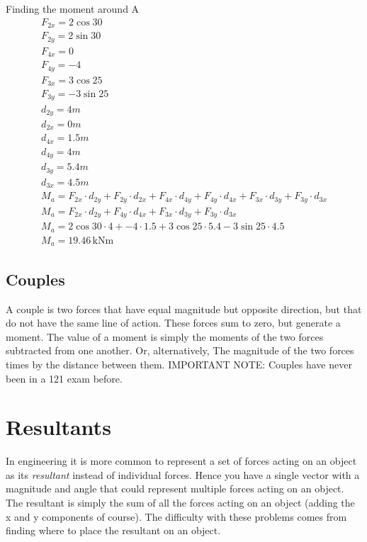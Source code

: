 \documentclass[a4paper, 12pt]{article}
\newcommand{\unit}[1]{\ensuremath{\, \mathrm{#1}}}
\begin{document}
Finding the moment around A
\begin{gather*}
    F_{2x} = 2\cos{30} \\ 
    F_{2y} = 2\sin{30} \\
    F_{4x} = 0 \\ 
    F_{4y} = -4 \\
    F_{3x} = 3\cos{25} \\
    F_{3y} = -3\sin{25} \\
    d_{2y} = 4m \\
    d_{2x} = 0m \\
    d_{4x} = 1.5m \\
    d_{4y} = 4m \\
    d_{3y} = 5.4m \\
    d_{3x} = 4.5m \\
    M_a = F_{2x} \cdot d_{2y} + F_{2y} \cdot d_{2x} + F_{4x} \cdot d_{4y} + F_{4y} \cdot d_{4x} + F_{3x} \cdot d_{3y} + F_{3y} \cdot d_{3x} \\
    M_a = F_{2x} \cdot d_{2y} + F_{4y} \cdot d_{4x} + F_{3x} \cdot d_{3y} + F_{3y} \cdot d_{3x} \\
    M_a = 2\cos{30} \cdot 4 + -4 \cdot 1.5 + 3\cos{25} \cdot 5.4 - 3\sin{25} \cdot 4.5 \\ 
    M_a = 19.46 \unit{kNm}
\end{gather*}
\subsection{Couples}
A couple is two forces that have equal magnitude but opposite direction, but that do not have the same line of action.
These forces sum to zero, but generate a moment. The value of a moment is simply the moments of the two forces subtracted from one another.
Or, alternatively, The magnitude of the two forces times by the distance between them. IMPORTANT NOTE: Couples have never been in a 121 exam before.

\section{Resultants}
In engineering it is more common to represent a set of forces acting on an object as its \textit{resultant} instead of individual forces.
Hence you have a single vector with a magnitude and angle that could represent multiple forces acting on an object. 
The resultant is simply the sum of all the forces acting on an object (adding the x and y components of course). 
The difficulty with these problems comes from finding where to place the resultant on an object.
\end{document}
